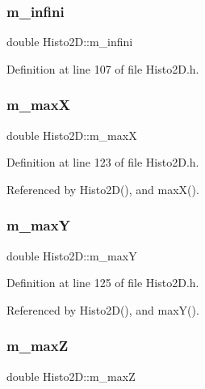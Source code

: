 \subsubsection{\texorpdfstring{m\+\_\+infini}{m\_infini}}
{\footnotesize\ttfamily double Histo2\+D\+::m\+\_\+infini\hspace{0.3cm}{\ttfamily [private]}}



Definition at line 107 of file Histo2\+D.\+h.

\mbox{\label{classHisto2D_af428efc9b984006eeba1a216f7d15d6d}} 
\subsubsection{\texorpdfstring{m\+\_\+maxX}{m\_maxX}}
{\footnotesize\ttfamily double Histo2\+D\+::m\+\_\+maxX\hspace{0.3cm}{\ttfamily [private]}}



Definition at line 123 of file Histo2\+D.\+h.



Referenced by Histo2\+D(), and max\+X().

\mbox{\label{classHisto2D_a049044e82d008636040c5c8815cac297}} 
\subsubsection{\texorpdfstring{m\+\_\+maxY}{m\_maxY}}
{\footnotesize\ttfamily double Histo2\+D\+::m\+\_\+maxY\hspace{0.3cm}{\ttfamily [private]}}



Definition at line 125 of file Histo2\+D.\+h.



Referenced by Histo2\+D(), and max\+Y().

\mbox{\label{classHisto2D_a82422535a6aeaf911129c91e0e44e603}} 
\subsubsection{\texorpdfstring{m\+\_\+maxZ}{m\_maxZ}}
{\footnotesize\ttfamily double Histo2\+D\+::m\+\_\+maxZ\hspace{0.3cm}{\ttfamily [private]}}



